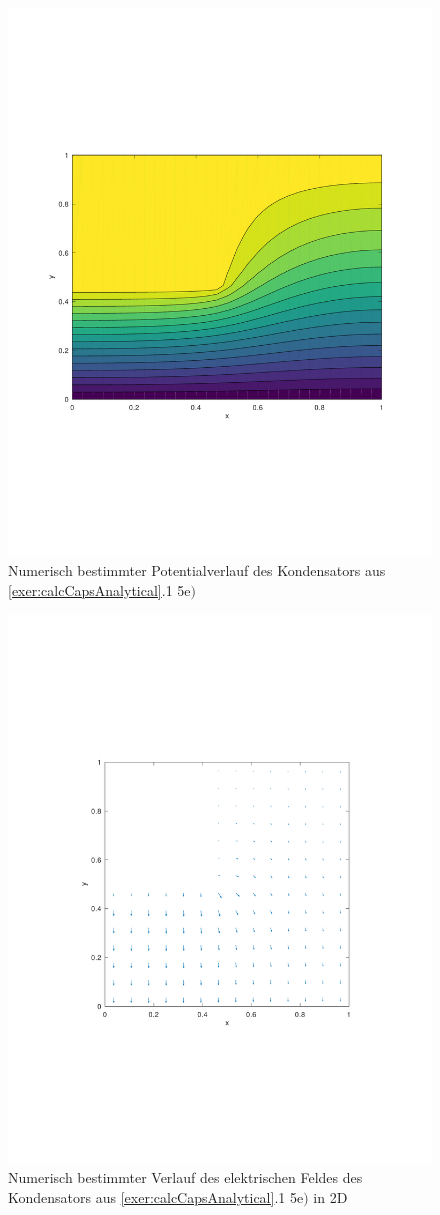 \documentclass[Protokollheft.tex]{subfiles}
\begin{document}
\begin{figure}[h!]
	\centering
	\includegraphics[trim = 20mm 70mm 20mm 70mm, clip,width=0.7\linewidth]{potential_E.pdf}
	\caption{Numerisch bestimmter Potentialverlauf des Kondensators aus \ref{exer:calcCapsAnalytical}.1 5e$)$}
\end{figure}

\begin{figure}[h!]
	\centering
	\includegraphics[trim = 20mm 70mm 20mm 70mm, clip,width=0.7\linewidth]{E_2D_E.pdf}
	\caption{Numerisch bestimmter Verlauf des elektrischen Feldes des Kondensators aus \ref{exer:calcCapsAnalytical}.1 5e$)$ in 2D}
\end{figure}
\end{document}
